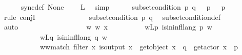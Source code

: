 \begin{isabellebody}
\ \ \ \ \isamarkupfalse%
\ sync{\isacharunderscore}{\kern0pt}def{\isacharcolon}{\kern0pt}\ {\isachardoublequoteopen}{\isasymT}\isactrlbsub None\isactrlesub {\isasymdownharpoonright}\isactrlsub {\isacharbang}{\kern0pt}\ {\isacharequal}{\kern0pt}\ {\isasymL}\isactrlsub {\isasymzero}{\isachardoublequoteclose}\ \isamarkupfalse%
\ {\isacartoucheopen}{\isacharquery}{\kern0pt}L{\isacartoucheclose}\ \isamarkupfalse%
\ simp\isanewline
\ \ \ \ \isamarkupfalse%
\ {\isachardoublequoteopen}subset{\isacharunderscore}{\kern0pt}condition\ p\ q\ {\isasymand}\ {\isasymL}\isactrlsup {\isacharasterisk}{\kern0pt}\ p\ {\isacharequal}{\kern0pt}\ {\isasymL}\isactrlsup {\isacharasterisk}{\kern0pt}\isactrlsub {\isasymsqunion}\isactrlsub {\isasymsqunion}\ p{\isachardoublequoteclose}\isanewline
\ \ \ \ \isamarkupfalse%
\ {\isacharparenleft}{\kern0pt}rule\ conjI{\isacharparenright}{\kern0pt}\isanewline
\ \ \ \ \ \ \isanewline
\ \ \ \ \ \ \isamarkupfalse%
\ {\isachardoublequoteopen}subset{\isacharunderscore}{\kern0pt}condition\ p\ q{\isachardoublequoteclose}\ \isamarkupfalse%
\ subset{\isacharunderscore}{\kern0pt}condition{\isacharunderscore}{\kern0pt}def\isanewline
\ \ \ \ \ \ \isamarkupfalse%
\ auto\isanewline
\ \ \ \ \ \ \ \ \isanewline
\ \ \ \ \ \ \ \ \isamarkupfalse%
\ w\ w{\isacharprime}{\kern0pt}\ x{\isacharprime}{\kern0pt}\isanewline
\ \ \ \ \ \ \ \ \isamarkupfalse%
\ w{\isacharunderscore}{\kern0pt}Lp{\isacharcolon}{\kern0pt}\ {\isachardoublequoteopen}is{\isacharunderscore}{\kern0pt}in{\isacharunderscore}{\kern0pt}infl{\isacharunderscore}{\kern0pt}lang\ p\ w{\isachardoublequoteclose}\isanewline
\ \ \ \ \ \ \ \ \ \ \ w{\isacharprime}{\kern0pt}{\isacharunderscore}{\kern0pt}Lq{\isacharcolon}{\kern0pt}\ {\isachardoublequoteopen}is{\isacharunderscore}{\kern0pt}in{\isacharunderscore}{\kern0pt}infl{\isacharunderscore}{\kern0pt}lang\ q\ w{\isacharprime}{\kern0pt}{\isachardoublequoteclose}\isanewline
\ \ \ \ \ \ \ \ \ \ \ w{\isacharprime}{\kern0pt}{\isacharunderscore}{\kern0pt}w{\isacharunderscore}{\kern0pt}match{\isacharcolon}{\kern0pt}\ {\isachardoublequoteopen}filter\ {\isacharparenleft}{\kern0pt}{\isasymlambda}x{\isachardot}{\kern0pt}\ is{\isacharunderscore}{\kern0pt}output\ x\ {\isasymand}\ {\isacharparenleft}{\kern0pt}get{\isacharunderscore}{\kern0pt}object\ x\ {\isacharequal}{\kern0pt}\ q\ {\isasymand}\ get{\isacharunderscore}{\kern0pt}actor\ x\ {\isacharequal}{\kern0pt}\ p\ \isanewline

\end{isabellebody}
